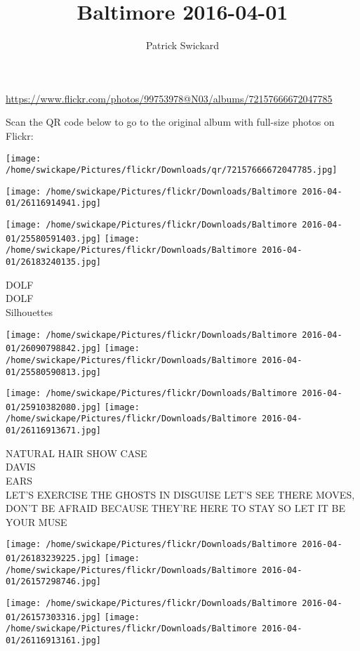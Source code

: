 \documentclass[10pt,letterpaper]{article}
\title{Baltimore 2016-04-01}
\author{Patrick Swickard}
\date{}
\begin{document}
\maketitle

\url{https://www.flickr.com/photos/99753978@N03/albums/72157666672047785}

Scan the QR code below to go to the original album with full-size photos on Flickr:

\texttt{[image: /home/swickape/Pictures/flickr/Downloads/qr/72157666672047785.jpg]}
\pagebreak

\texttt{[image: /home/swickape/Pictures/flickr/Downloads/Baltimore 2016-04-01/26116914941.jpg]}

\vspace{0.25in}
\texttt{[image: /home/swickape/Pictures/flickr/Downloads/Baltimore 2016-04-01/25580591403.jpg]}
\texttt{[image: /home/swickape/Pictures/flickr/Downloads/Baltimore 2016-04-01/26183240135.jpg]}

DOLF\\
DOLF\\
Silhouettes
\pagebreak

\texttt{[image: /home/swickape/Pictures/flickr/Downloads/Baltimore 2016-04-01/26090798842.jpg]}
\texttt{[image: /home/swickape/Pictures/flickr/Downloads/Baltimore 2016-04-01/25580590813.jpg]}

\texttt{[image: /home/swickape/Pictures/flickr/Downloads/Baltimore 2016-04-01/25910382080.jpg]}
\texttt{[image: /home/swickape/Pictures/flickr/Downloads/Baltimore 2016-04-01/26116913671.jpg]}

NATURAL HAIR SHOW CASE\\
DAVIS\\
EARS\\
LET'S EXERCISE THE GHOSTS IN DISGUISE LET'S SEE THERE MOVES, DON'T BE AFRAID BECAUSE THEY'RE HERE TO STAY SO LET IT BE YOUR MUSE
\pagebreak

\texttt{[image: /home/swickape/Pictures/flickr/Downloads/Baltimore 2016-04-01/26183239225.jpg]}
\texttt{[image: /home/swickape/Pictures/flickr/Downloads/Baltimore 2016-04-01/26157298746.jpg]}

\texttt{[image: /home/swickape/Pictures/flickr/Downloads/Baltimore 2016-04-01/26157303316.jpg]}
\texttt{[image: /home/swickape/Pictures/flickr/Downloads/Baltimore 2016-04-01/26116913161.jpg]}
\end{document}
